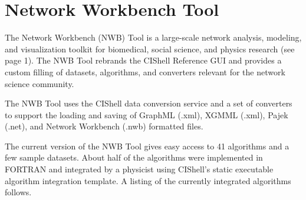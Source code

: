 \section{Network Workbench Tool}


The Network Workbench (NWB) Tool \cite{nwb} is a large-scale network analysis, 
modeling, and visualization toolkit for biomedical, social science, and physics 
research (see page 1). The NWB Tool rebrands the CIShell Reference GUI and 
provides a custom filling of datasets, algorithms, and converters relevant for 
the network science community.

The NWB Tool uses the CIShell data conversion service and a set of converters 
to support the loading and saving of GraphML (.xml), XGMML (.xml), Pajek (.net), 
and Network Workbench (.nwb) formatted files.

The current version of the NWB Tool gives easy access to 41 algorithms and a 
few sample datasets. About half of the algorithms were implemented in FORTRAN 
and integrated by a physicist using CIShell's static executable algorithm 
integration template. A listing of the currently integrated algorithms follows.

